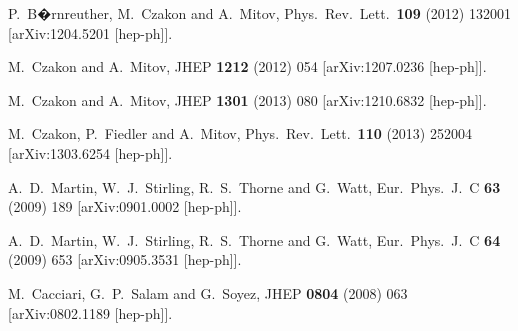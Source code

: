 \documentclass[preprintnumbers,superscriptaddress,nofootinbib,aps,prd,floatfix]{revtex4}
\begin{document}
\begin{thebibliography}{99}
  P.~B�rnreuther, M.~Czakon and A.~Mitov,
  Phys.\ Rev.\ Lett.\  {\bf 109} (2012) 132001
  [arXiv:1204.5201 [hep-ph]].


  M.~Czakon and A.~Mitov,
  JHEP {\bf 1212} (2012) 054
  [arXiv:1207.0236 [hep-ph]].
      
  
  M.~Czakon and A.~Mitov,
  JHEP {\bf 1301} (2013) 080
  [arXiv:1210.6832 [hep-ph]].


  M.~Czakon, P.~Fiedler and A.~Mitov,
  Phys.\ Rev.\ Lett.\  {\bf 110} (2013) 252004
  [arXiv:1303.6254 [hep-ph]].


  A.~D.~Martin, W.~J.~Stirling, R.~S.~Thorne and G.~Watt,
  Eur.\ Phys.\ J.\ C {\bf 63} (2009) 189
  [arXiv:0901.0002 [hep-ph]].


  A.~D.~Martin, W.~J.~Stirling, R.~S.~Thorne and G.~Watt,
  Eur.\ Phys.\ J.\ C {\bf 64} (2009) 653
  [arXiv:0905.3531 [hep-ph]].


  M.~Cacciari, G.~P.~Salam and G.~Soyez,
  JHEP {\bf 0804} (2008) 063
  [arXiv:0802.1189 [hep-ph]].
  

\end{thebibliography}
\end{document}
